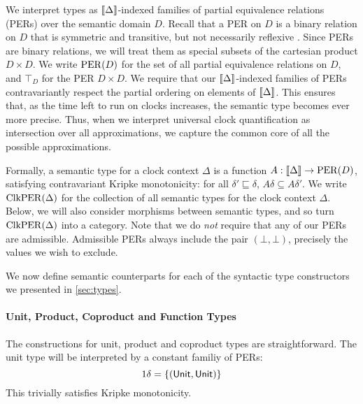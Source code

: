 We interpret types as $\llbracket \Delta \rrbracket$-indexed families of partial
equivalence relations (PERs) over the semantic domain $D$. Recall that
a PER on $D$ is a binary relation on $D$ that is symmetric and
transitive, but not necessarily reflexive \cite{mitchell}. Since PERs
are binary relations, we will treat them as special subsets of the
cartesian product $D \times D$. We write $\mathrm{PER}(D)$ for the set of all
partial equivalence relations on $D$, and $\top_D$ for the PER $D
\times D$.  We require that our $\llbracket \Delta \rrbracket$-indexed families of
PERs contravariantly respect the partial ordering on elements of
$\llbracket \Delta \rrbracket$. This ensures that, as the time left to run on clocks
increases, the semantic type becomes ever more precise. Thus, when we
interpret universal clock quantification as intersection over all
approximations, we capture the common core of all the possible
approximations.

Formally, a semantic type for a clock context $\Delta$ is a function
$A : \llbracket \Delta \rrbracket \to \mathrm{PER}(D)$, satisfying contravariant Kripke
monotonicity: for all $\delta' \sqsubseteq \delta$, $A\delta \subseteq
A\delta'$. We write $\mathrm{ClkPER}(\Delta)$ for the collection of all
semantic types for the clock context $\Delta$. Below, we will also
consider morphisms between semantic types, and so turn
$\mathrm{ClkPER}(\Delta)$ into a category.  Note that we do \emph{not} require that any of our PERs are
admissible. Admissible PERs always include the pair $(\bot,\bot)$,
precisely the values we wish to exclude.

We now define semantic counterparts for each of the syntactic type
constructors we presented in \autoref{sec:types}.

\paragraph{Unit, Product, Coproduct and Function Types}

The constructions for unit, product and coproduct types are
straightforward. The unit type will be interpreted by a constant
familiy of PERs:
\begin{displaymath}
  1\delta = \{(\mathsf{Unit}, \mathsf{Unit})\}
\end{displaymath}
This trivially satisfies Kripke monotonicity.

